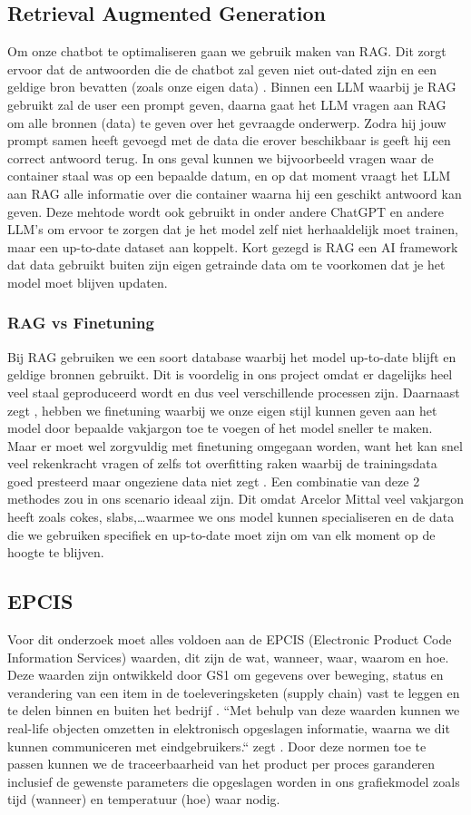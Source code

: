 \subsection{Retrieval Augmented Generation}
Om onze chatbot te optimaliseren gaan we gebruik maken van RAG.
Dit zorgt ervoor dat de antwoorden die de chatbot zal geven niet out-dated zijn en een geldige bron bevatten (zoals onze eigen data) \autocite{IBM2023}.
Binnen een LLM waarbij je RAG gebruikt zal de user een prompt geven, daarna gaat het LLM vragen aan RAG om alle bronnen (data) te geven over het gevraagde onderwerp.
Zodra hij jouw prompt samen heeft gevoegd met de data die erover beschikbaar is geeft hij een correct antwoord terug.
In ons geval kunnen we bijvoorbeeld vragen waar de container staal was op een bepaalde datum, en op dat moment vraagt het LLM aan RAG alle informatie over die container waarna hij een geschikt antwoord kan geven.
Deze mehtode wordt ook gebruikt in onder andere ChatGPT en andere LLM's om ervoor te zorgen dat je het model zelf niet herhaaldelijk moet trainen, maar een up-to-date dataset aan koppelt.
Kort gezegd is RAG een AI framework dat data gebruikt buiten zijn eigen getrainde data om te voorkomen dat je het model moet blijven updaten.
\subsubsection{RAG vs Finetuning}
Bij RAG gebruiken we een soort database waarbij het model up-to-date blijft en geldige bronnen gebruikt. Dit is voordelig in ons project omdat er dagelijks heel veel staal geproduceerd wordt en dus veel verschillende processen zijn.
Daarnaast zegt \textcite{IBM2024}, hebben we finetuning waarbij we onze eigen stijl kunnen geven aan het model door bepaalde vakjargon toe te voegen of het model sneller te maken.
Maar er moet wel zorgvuldig met finetuning omgegaan worden, want het kan snel veel rekenkracht vragen of zelfs tot overfitting raken waarbij de trainingsdata goed presteerd maar ongeziene data niet zegt \textcite{EASIIO2022}.
Een combinatie van deze 2 methodes zou in ons scenario ideaal zijn. Dit omdat Arcelor Mittal veel vakjargon heeft zoals cokes, slabs,\dots waarmee we ons model kunnen specialiseren en de data die we gebruiken specifiek en up-to-date moet zijn om van elk moment op de hoogte te blijven.

\subsection{EPCIS}
Voor dit onderzoek moet alles voldoen aan de EPCIS (Electronic Product Code Information Services) waarden, dit zijn de wat, wanneer, waar, waarom en hoe. 
Deze waarden zijn ontwikkeld door GS1 om gegevens over beweging, status en verandering van een item in de toeleveringsketen (supply chain) vast te leggen en te delen binnen en buiten het bedrijf \autocite{Devins}.
``Met behulp van deze waarden kunnen we real-life objecten omzetten in elektronisch opgeslagen informatie, waarna we dit kunnen communiceren met eindgebruikers.`` zegt \textcite{Devins}.
Door deze normen toe te passen kunnen we de traceerbaarheid van het product per proces garanderen inclusief de gewenste parameters die opgeslagen worden in ons grafiekmodel zoals tijd (wanneer) en temperatuur (hoe) waar nodig.
